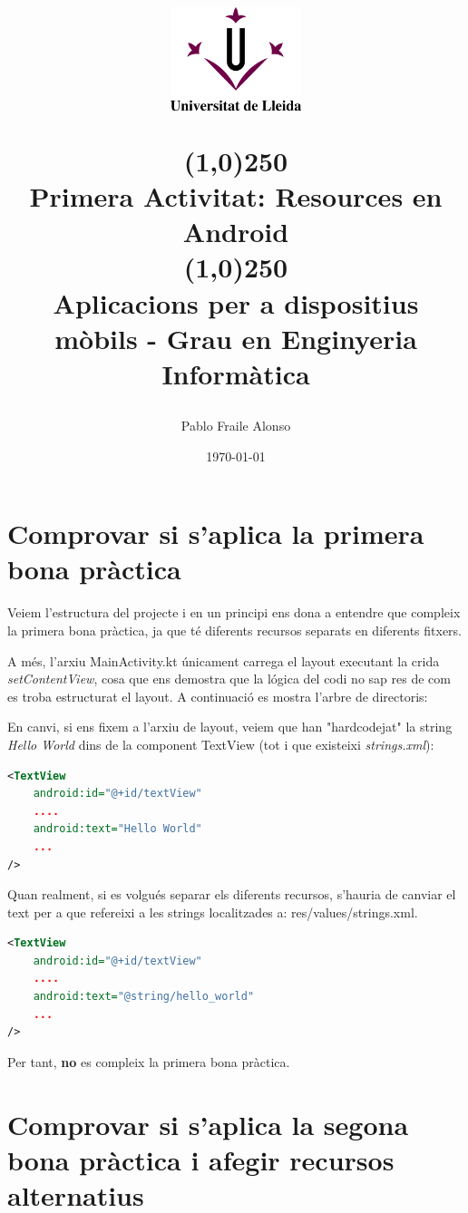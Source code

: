 \documentclass[12pt, letterpaper]{article}
\title{%
    \begin{center}
	\includegraphics[width=4cm,height=3cm]{udl.png}
    \end{center}
    \line(1,0){250}\\[0.3cm]
    \textbf{Primera Activitat: Resources en Android} \\
    \line(1,0){250}
    \\[0.5cm]
	\large Aplicacions per a dispositius mòbils - Grau en Enginyeria Informàtica
}
\author{Pablo Fraile Alonso}
\date{\today}
\begin{document}
    
\maketitle
\thispagestyle{empty}
\newpage
\tableofcontents
\listoffigures
\newpage

\section{Comprovar si s'aplica la primera bona pràctica}
Veiem l'estructura del projecte i en un principi ens dona a entendre que compleix la primera bona pràctica, ja que té diferents recursos separats en diferents fitxers. 

A més, l'arxiu MainActivity.kt únicament carrega el layout executant la crida \textit{setContentView}, cosa que ens demostra que la lógica del codi no sap res de com es troba estructurat el layout. A continuació es mostra l'arbre de directoris:

\vspace{0.5cm}
\vspace{0.5cm}

En canvi, si ens fixem a l'arxiu de layout, veiem que han "hardcodejat" la string \textit{Hello World} dins de la component TextView (tot i que existeixi \textit{strings.xml}):

\begin{lstlisting}[language=XML]
<TextView
    android:id="@+id/textView"
    ....
    android:text="Hello World"
    ...
/>
\end{lstlisting}

Quan realment, si es volgués separar els diferents recursos, s'hauria de canviar el text per a que refereixi a les strings localitzades a: res/values/strings.xml.

\begin{lstlisting}[language=XML]
<TextView
    android:id="@+id/textView"
    ....
    android:text="@string/hello_world"
    ...
/>
\end{lstlisting}

Per tant, \textbf{no} es compleix la primera bona pràctica.

\newpage
\section{Comprovar si s'aplica la segona bona pràctica i afegir recursos alternatius}
\end{document}
